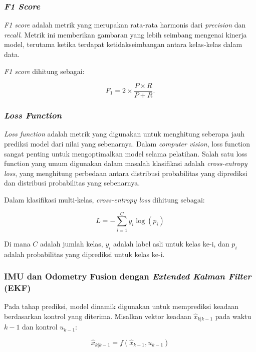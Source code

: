 \subsubsection{\emph{F1 Score}}
\emph{F1 score} adalah metrik yang merupakan rata-rata harmonis dari \emph{precision} dan \emph{recall}. Metrik ini memberikan gambaran yang lebih seimbang mengenai kinerja model, terutama ketika terdapat ketidakseimbangan antara kelas-kelas dalam data.

\emph{F1 score} dihitung sebagai:

\begin{equation}
  F_1 = 2 \times \frac{P \times R}{P + R}.
\end{equation}


\subsubsection{\emph{Loss Function}}
\emph{Loss function} adalah metrik yang digunakan untuk menghitung seberapa jauh prediksi model dari nilai yang sebenarnya. Dalam \emph{computer vision}, loss function sangat penting untuk mengoptimalkan model selama pelatihan. Salah satu loss function yang umum digunakan dalam masalah klasifikasi adalah \emph{cross-entropy loss}, yang menghitung perbedaan antara distribusi probabilitas yang diprediksi dan distribusi probabilitas yang sebenarnya.

Dalam klasifikasi multi-kelas, \emph{cross-entropy loss} dihitung sebagai:

\begin{equation}
L = -\sum_{i=1}^{C} y_i \log(p_i)
\end{equation}

Di mana \( C \) adalah jumlah kelas, \( y_i \) adalah label asli untuk kelas ke-i, dan \( p_i \) adalah probabilitas yang diprediksi untuk kelas ke-i.


\subsubsection{IMU dan Odometry Fusion dengan \textit{Extended Kalman Filter} (EKF)}
Pada tahap prediksi, model dinamik digunakan untuk memprediksi keadaan berdasarkan kontrol yang diterima. Misalkan vektor keadaan \( \hat{x}_{k|k-1} \) pada waktu \( k-1 \) dan kontrol \( u_{k-1} \):

\begin{equation}
\hat{x}_{k|k-1} = f(\hat{x}_{k-1}, u_{k-1})
\end{equation}

